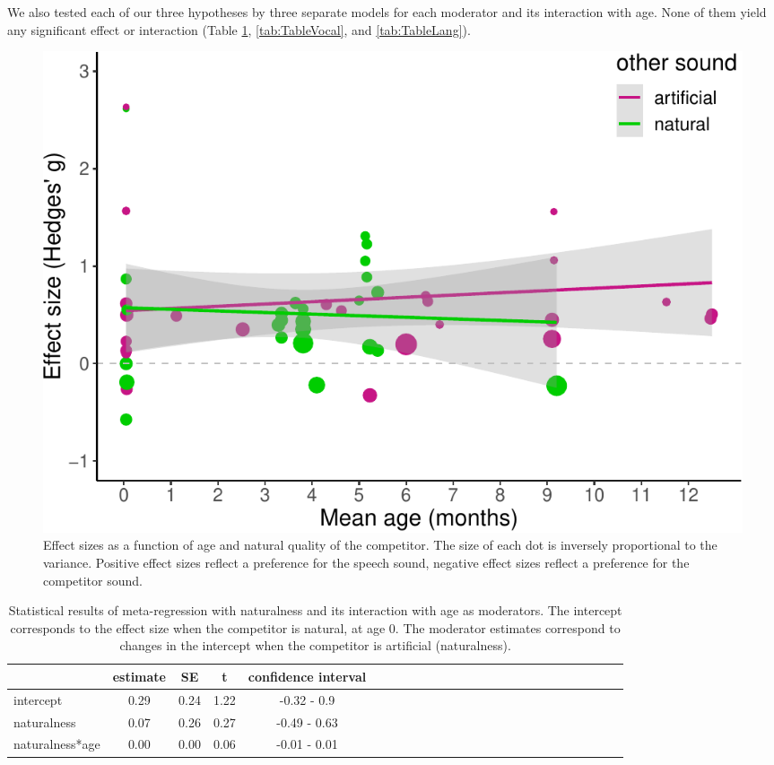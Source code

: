 \documentclass[man]{apa6}
\begin{document}
We also tested each of our three hypotheses by three separate models for
each moderator and its interaction with age. None of them yield any
significant effect or interaction (Table \ref{tab:TableNatural},
\ref{tab:TableVocal}, and \ref{tab:TableLang}).

\begin{figure}
\centering
\includegraphics{MA_speech_pref_files/figure-latex/natural-1.pdf}
\caption{\label{fig:natural}Effect sizes as a function of age and natural
quality of the competitor. The size of each dot is inversely
proportional to the variance. Positive effect sizes reflect a preference
for the speech sound, negative effect sizes reflect a preference for the
competitor sound.}
\end{figure}

\begin{table}[tbp]
\begin{center}
\begin{threeparttable}
\caption{\label{tab:TableNatural}Statistical results of meta-regression with naturalness and its interaction with age as moderators. The intercept corresponds to the effect size when the competitor is natural, at age 0. The moderator estimates correspond to changes in the intercept when the competitor is artificial (naturalness).}
\begin{tabular}{lcccclcccclcccclcccclcccc}
\toprule
 & estimate & SE & t & confidence interval\\
\midrule
intercept & 0.29 & 0.24 & 1.22 & -0.32 - 0.9\\
naturalness & 0.07 & 0.26 & 0.27 & -0.49 - 0.63\\
naturalness*age & 0.00 & 0.00 & 0.06 & -0.01 - 0.01\\
\bottomrule
\end{tabular}
\end{threeparttable}
\end{center}
\end{table}
\end{document}
